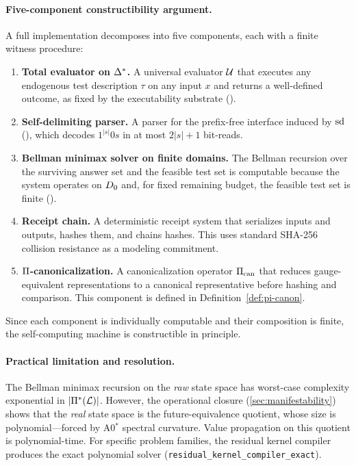 \paragraph{Five-component constructibility argument.}
A full implementation decomposes into five components, each with a finite
witness procedure:
\begin{enumerate}[nosep]
  \item \textbf{Total evaluator on $\Delta^*$.}  A universal evaluator $\mathcal{U}$
        that executes any endogenous test description $\tau$ on any input
        $x$ and returns a well-defined outcome, as fixed by the
        executability substrate ().
  \item \textbf{Self-delimiting parser.}  A parser for the prefix-free
        interface induced by $\mathrm{sd}$ (), which decodes
        $1^{|s|}0s$ in at most $2|s|+1$ bit-reads.
  \item \textbf{Bellman minimax solver on finite domains.}  The Bellman
        recursion over the surviving answer set and the feasible test set
        is computable because the system operates on $D_0$ and, for
        fixed remaining budget, the feasible test set is finite
        ().
  \item \textbf{Receipt chain.}  A deterministic receipt system that
        serializes inputs and outputs, hashes them, and chains hashes.
        This uses standard SHA-256
        collision resistance as a modeling commitment.
  \item \textbf{$\Pi$-canonicalization.}  A canonicalization operator
        $\Pi_{\mathrm{can}}$ that reduces gauge-equivalent representations to a
        canonical representative before hashing and comparison.  This
        component is defined in Definition~\ref{def:pi-canon}.
\end{enumerate}
Since each component is individually computable and their composition is
finite, the self-computing machine is constructible in principle.

\paragraph{Practical limitation and resolution.}
The Bellman minimax recursion on the \emph{raw} state space has worst-case
complexity exponential in $|\Pi^*(\mathcal{L})|$.  However, the operational
closure (\cref{sec:manifestability}) shows that the \emph{real} state space
is the future-equivalence quotient, whose size is polynomial---forced by
A0$^*$ spectral curvature.  Value propagation on this quotient is
polynomial-time.  For specific problem families, the residual kernel
compiler produces the exact polynomial solver
(\texttt{residual\_kernel\_compiler\_exact}).

